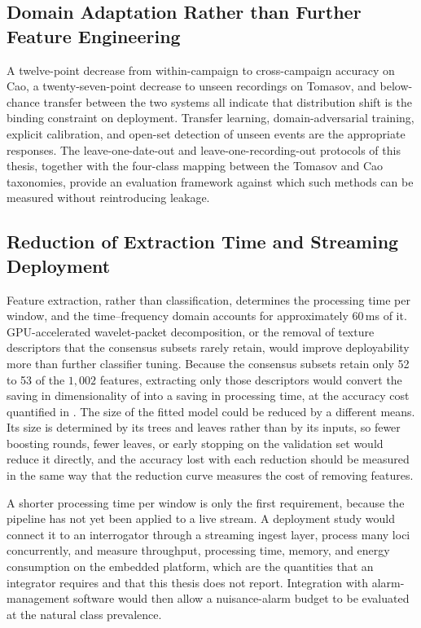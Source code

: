\subsection{Domain Adaptation Rather than Further Feature Engineering}
\label{sec:chap5FutureAdaptation}
A twelve-point decrease from within-campaign to cross-campaign accuracy on Cao, a twenty-seven-point decrease to unseen recordings on Tomasov, and below-chance transfer between the two systems all indicate that distribution shift is the binding constraint on deployment. Transfer learning, domain-adversarial training, explicit calibration, and open-set detection of unseen events are the appropriate responses. The leave-one-date-out and leave-one-recording-out protocols of this thesis, together with the four-class mapping between the Tomasov and Cao taxonomies, provide an evaluation framework against which such methods can be measured without reintroducing leakage.

\subsection{Reduction of Extraction Time and Streaming Deployment}
\label{sec:chap5FutureCost}
Feature extraction, rather than classification, determines the processing time per window, and the time--frequency domain accounts for approximately $60$\,ms of it. GPU-accelerated wavelet-packet decomposition, or the removal of texture descriptors that the consensus subsets rarely retain, would improve deployability more than further classifier tuning. Because the consensus subsets retain only 52 to 53 of the $1{,}002$ features, extracting only those descriptors would convert the saving in dimensionality of  into a saving in processing time, at the accuracy cost quantified in . The size of the fitted model could be reduced by a different means. Its size is determined by its trees and leaves rather than by its inputs, so fewer boosting rounds, fewer leaves, or early stopping on the validation set would reduce it directly, and the accuracy lost with each reduction should be measured in the same way that the reduction curve measures the cost of removing features.

A shorter processing time per window is only the first requirement, because the pipeline has not yet been applied to a live stream. A deployment study would connect it to an interrogator through a streaming ingest layer, process many loci concurrently, and measure throughput, processing time, memory, and energy consumption on the embedded platform, which are the quantities that an integrator requires and that this thesis does not report. Integration with alarm-management software would then allow a nuisance-alarm budget to be evaluated at the natural class prevalence.

